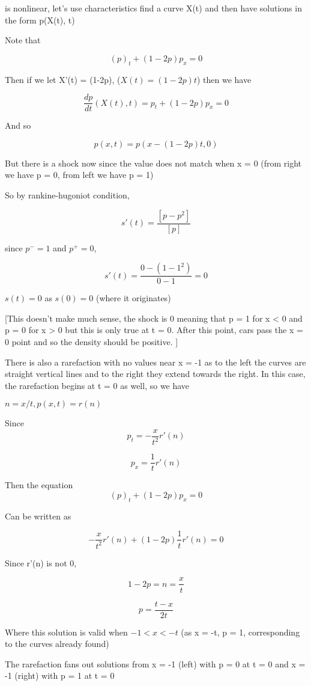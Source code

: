 \documentclass{article}
\begin{document}
is nonlinear, let's use characteristics find a curve X(t) and then have solutions in the form p(X(t), t)

Note that

$$(p)_t + (1-2p)p_x= 0$$ 

Then if we let X'(t) = (1-2p), ($X(t) = (1-2p)t$) then we have

$$\frac{dp}{dt}(X(t), t) = p_t + (1-2p)p_x = 0$$

And so

$$p(x, t) = p(x-(1-2p)t, 0)$$



But there is a shock now since the value does not match when x = 0 (from right we have p = 0, from left we have p = 1)

So by rankine-hugoniot condition,

$$s'(t) = \frac{[p-p^2]}{[p]}$$  

since $p^- = 1$ and $p^+ = 0$, 

$$s'(t) = \frac{0-(1-1^2)}{0-1} = 0$$

$s(t) = 0$ as $s(0) = 0$ (where it originates)

[This doesn't make much sense, the shock is 0 meaning that p = 1 for x < 0 and p = 0 for x > 0 but this is only true at t = 0. After this point, cars pass the x = 0 point and so the density should be positive. ]

There is also a rarefaction with no values near x = -1 as to the left the curves are straight vertical lines and to the right they extend towards the right. In this case, the rarefaction begins at t = 0 as well, so we have

$n = x/t, p(x, t) = r(n)$

Since $$p_t = - \frac{x}{t^2} r'(n)$$ 

$$p_x = \frac{1}{t} r'(n)$$

Then the equation $$(p)_t + (1-2p)p_x= 0$$ 

Can be written as

$$- \frac{x}{t^2} r'(n) + (1-2p)\frac{1}{t} r'(n) = 0 $$

Since r'(n) is not 0, 

$$1 - 2p = n = \frac{x}{t}$$

$$p = \frac{t - x }{2t}$$

Where this solution is valid when $ -1 < x < -t$ (as x = -t, p = 1, corresponding to the curves already found)

The rarefaction fans out solutions from x = -1 (left) with p = 0 at t = 0 and x = -1 (right) with p = 1 at t = 0
\end{document}
